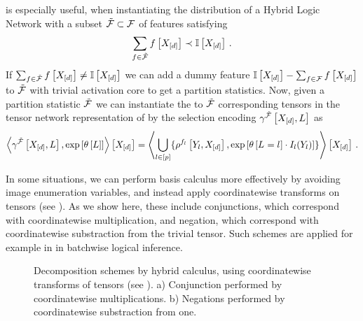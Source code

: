  is especially useful, when instantiating the distribution of a Hybrid Logic Network with a subset $\tilde{\mathcal{F}}\subset\mathcal{F}$ of features satisfying
\begin{align*}
    \sum_{f\in\tilde{\mathcal{F}}} f\left[X_{[d]}\right] \prec \mathbb{I}\left[X_{[d]}\right] \, .
\end{align*}
If $\sum_{f\in\tilde{\mathcal{F}}} f\left[X_{[d]}\right] \neq \mathbb{I}\left[X_{[d]}\right]$ we can add a dummy feature $\mathbb{I}\left[X_{[d]}\right]-\sum_{f\in\mathcal{F}} f\left[X_{[d]}\right]$ to $\tilde{\mathcal{F}}$ with trivial activation core to get a partition statistics.
Now, given a partition statistic $\tilde{\mathcal{F}}$ we can instantiate the to $\tilde{\mathcal{F}}$ corresponding tensors in the tensor network representation of  by the selection encoding $\gamma^{\tilde{\mathcal{F}}}\left[X_{[d]},L\right]$ as
\begin{align*}
    \left\langle \gamma^{\tilde{\mathcal{F}}}\left[X_{[d]},L\right],\mathrm{exp}\left[\theta\left[L\right]\right]\right\rangle \left[ X_{[d]} \right]
    = \left\langle \bigcup_{l\in[p]}\{\rho^{f_{l}}\left[Y_{l},X_{[d]}\right],\mathrm{exp}\left[\theta\left[L_{}=l_{}\right]\cdot I_{l}(Y_{l})\right]\}\right\rangle \left[ X_{[d]} \right] \, .
\end{align*}


\label{sec:hybridCalculus}

In some situations, we can perform basis calculus more effectively by avoiding image enumeration variables, and instead apply coordinatewise transforms on tensors (see ).
As we show here, these include conjunctions, which correspond with coordinatewise multiplication, and negation, which correspond with coordinatewise substraction from the trivial tensor.
Such schemes are applied for example in \cite{tsilionis_tensor-based_2024} in batchwise logical inference.

\begin{figure}
    \begin{center}
        
    \end{center}
    \caption{Decomposition schemes by hybrid calculus, using coordinatewise transforms of tensors (see ).
    a) Conjunction performed by coordinatewise multiplications.
    b) Negations performed by coordinatewise substraction from one.}\label{fig:ConNegDecomposition}
\end{figure}

